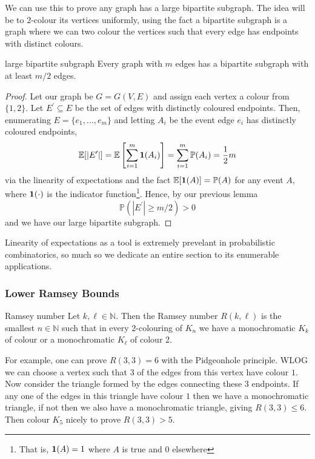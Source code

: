 \documentclass{article}
\begin{document}
We can use this to prove any graph has a large bipartite subgraph. The idea will be to $2$-colour its vertices 
uniformly, using the fact a bipartite subgraph is a graph where we can two colour the vertices such that 
every edge has endpoints with distinct colours. 

\begin{proposition}[]{large bipartite subgraph}
    Every graph with $m$ edges has a bipartite subgraph with at least $m/2$ edges.
\end{proposition}

\begin{proof}
    Let our graph be $G = G(V, E)$ and assign each vertex a colour from $\{1, 2\}$. Let $E^\prime \subseteq E$ be 
    the set of edges with distinctly coloured endpoints. Then, enumerating $E = \{e_1, \dots, e_m\}$ and letting 
    $A_i$ be the event edge $e_i$ has distinctly coloured endpoints, 
    \[\mathbb{E}[|E^\prime|] = \mathbb{E}\left[\sum_{i = 1}^m{\bf 1}(A_i)\right] = \sum_{i=1}^m \mathbb{P}(A_i) = \frac{1}{2}m\]
    via the linearity of expectations and the fact $\mathbb{E}[{\bf 1}(A)] = \mathbb{P}(A)$ for any event $A$, 
    where ${\bf 1}(\cdot)$ is the indicator function\footnote{That is, ${\bf 1}(A) = 1$ where $A$ is true and $0$ elsewhere}. 
    Hence, by our previous lemma 
    \[\mathbb{P}(|E^\prime| \geq m/2) > 0\] 
    and we have our large bipartite subgraph.
\end{proof}

Linearity of expectations as a tool is extremely prevelant in probabilistic combinatorics, so much so 
we dedicate an entire section to its enumerable applications. \\ 

\subsubsection{Lower Ramsey Bounds}

\begin{definition}[]{Ramsey number}
    Let $k, \ell \in \mathbb{N}$. Then the Ramsey number $R(k, \ell)$ is the smallest $n \in \mathbb{N}$ such that 
    in every $2$-colouring of $K_n$ we have a monochromatic $K_k$ of colour or a monochromatic $K_\ell$ of colour 2.
\end{definition}

For example, one can prove $R(3,3) = 6$ with the Pidgeonhole principle. WLOG we can choose a vertex such that 
$3$ of the edges from this vertex have colour $1$. Now consider the triangle formed by the edges connecting these $3$
endpoints. If any one of the edges in this triangle have colour $1$ then we have a monochromatic triangle, if not 
then we also have a monochromatic triangle, giving $R(3,3) \leq 6$. Then colour $K_5$ nicely to prove $R(3,3) > 5$. 
\end{document}
